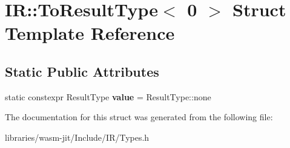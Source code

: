 \hypertarget{struct_i_r_1_1_to_result_type_3_010_01_4}{}\section{IR\+:\+:To\+Result\+Type$<$ 0 $>$ Struct Template Reference}
\label{struct_i_r_1_1_to_result_type_3_010_01_4}
\subsection*{Static Public Attributes}
\begin{DoxyCompactItemize}
\item 
\mbox{\label{struct_i_r_1_1_to_result_type_3_010_01_4_a79d77382d3570e1fd502fba8c2435ee9}} 
static constexpr Result\+Type {\bfseries value} = Result\+Type\+::none
\end{DoxyCompactItemize}


The documentation for this struct was generated from the following file\+:\begin{DoxyCompactItemize}
\item 
libraries/wasm-\/jit/\+Include/\+I\+R/Types.\+h\end{DoxyCompactItemize}
